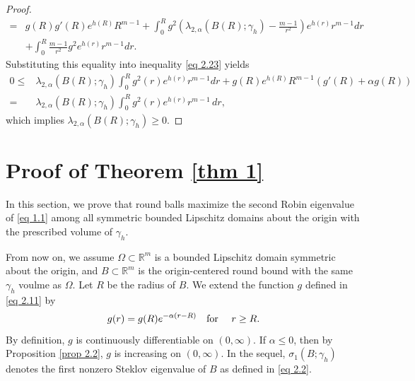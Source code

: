 \documentclass[11pt,leqno]{amsart}
\def\a{\alpha}
\def\R{\mathbb{R}}
\numberwithin{equation}{section}
\begin{document}
\begin{proof}
\begin{align*}
    =&g(R)g'(R)e^{h(R)}R^{m-1}+\int_{0}^{R}g^{2}(\lambda_{2,\alpha}(B(R);\gamma_h)-\frac{m-1}{r^{2}})e^{h(r)}r^{m-1}dr\\
    &+\int_{0}^{R}\frac{m-1}{r^{2}}g^{2}e^{h(r)}r^{m-1}dr.
\end{align*}
Substituting this equality into  inequality \eqref{eq 2.23} yields
  \begin{align*}
      0\leq& \lambda_{2,\alpha}(B(R);\gamma_h)\int_{0}^{R}g^{2}(r)e^{h(r)}r^{m-1}dr+g(R)e^{h(R)}R^{m-1}(g'(R)+\alpha g(R))\\
      =&\lambda_{2,\alpha}(B(R);\gamma_h)\int_{0}^{R}g^{2}(r)e^{h(r)}r^{m-1}\, dr,
  \end{align*}
which implies $\lambda_{2,\alpha}(B(R);\gamma_h)\geq 0$.
\end{proof}

\section{Proof of  Theorem \ref{thm 1}}\label{sect3}
In this section, we prove that round balls maximize the second Robin eigenvalue of \eqref{eq 1.1} among all symmetric bounded Lipschitz domains about the origin with the prescribed volume of $\gamma_h$. 

From now on, we assume $\Omega\subset \R^m$ is  a bounded Lipschitz domain symmetric about the origin, and $B\subset \R^m$ is the origin-centered round bound with the same $\gamma_h$ voulme as $\Omega$. Let $R$ be the radius of $B$. We extend the function $g$ defined in \eqref{eq 2.11} by
\begin{equation}\label{eq 3.1}
g(r)=g(R) e^{-\a(r-R)}\text{\quad for \quad} r\ge R.
\end{equation}
By definition, $g$ is continuously differentiable on $(0,\infty)$. If $\a\le 0$, then by Proposition \ref{prop 2.2}, $g$ is increasing on $(0,\infty)$. In  the sequel, $\sigma_1(B; \gamma_h)$ denotes the first nonzero Steklov eigenvalue of $B$ as defined in \eqref{eq 2.2}.
\end{document}
